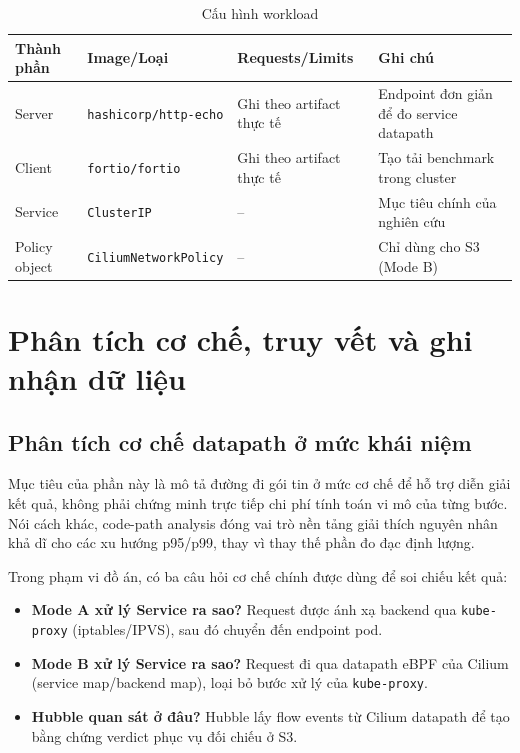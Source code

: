 \begin{table}[H]
\centering
\caption{Cấu hình workload}
\label{tab:workload-config}
\renewcommand{\arraystretch}{1.4}
\begin{tabularx}{\textwidth}{|>{\raggedright\arraybackslash}p{2.2cm}|>{\raggedright\arraybackslash}p{4.4cm}|>{\raggedright\arraybackslash}p{3.4cm}|>{\raggedright\arraybackslash}X|}
\hline
\textbf{Thành phần} & \textbf{Image/Loại} & \textbf{Requests/Limits} & \textbf{Ghi chú} \\
\hline
Server & \texttt{hashicorp/http-echo} & Ghi theo artifact thực tế & Endpoint đơn giản để đo service datapath \\
\hline
Client & \texttt{fortio/fortio} & Ghi theo artifact thực tế & Tạo tải benchmark trong cluster \\
\hline
Service & \texttt{ClusterIP} & -- & Mục tiêu chính của nghiên cứu \\
\hline
Policy object & \texttt{CiliumNetworkPolicy} & -- & Chỉ dùng cho S3 (Mode B) \\
\hline
\end{tabularx}
\end{table}
\section{Phân tích cơ chế, truy vết và ghi nhận dữ liệu}
\label{sec:code-tracing-logging}

\subsection{Phân tích cơ chế datapath ở mức khái niệm}
Mục tiêu của phần này là mô tả đường đi gói tin ở mức cơ chế để hỗ trợ diễn giải kết quả, không phải chứng minh trực tiếp chi phí tính toán vi mô của từng bước. Nói cách khác, code-path analysis đóng vai trò nền tảng giải thích nguyên nhân khả dĩ cho các xu hướng p95/p99, thay vì thay thế phần đo đạc định lượng.

Trong phạm vi đồ án, có ba câu hỏi cơ chế chính được dùng để soi chiếu kết quả:
\begin{itemize}
  \item \textbf{Mode A xử lý Service ra sao?} Request được ánh xạ backend qua \texttt{kube-proxy} (iptables/IPVS), sau đó chuyển đến endpoint pod.
  \item \textbf{Mode B xử lý Service ra sao?} Request đi qua datapath eBPF của Cilium (service map/backend map), loại bỏ bước xử lý của \texttt{kube-proxy}.
  \item \textbf{Hubble quan sát ở đâu?} Hubble lấy flow events từ Cilium datapath để tạo bằng chứng verdict phục vụ đối chiếu ở S3.
\end{itemize}

